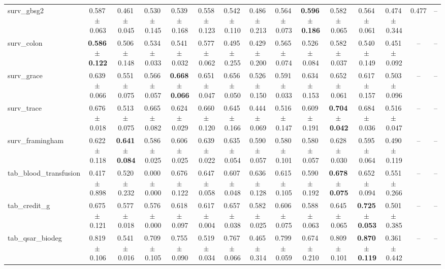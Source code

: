 \documentclass[8pt]{extarticle}
\begin{document}
\begin{longtable}{l*{14}{c}}
surv\_gbsg2 & 0.587\,$\pm$\,0.063 & 0.461\,$\pm$\,0.045 & 0.530\,$\pm$\,0.145 & 0.539\,$\pm$\,0.168 & 0.558\,$\pm$\,0.123 & 0.542\,$\pm$\,0.110 & 0.486\,$\pm$\,0.213 & 0.564\,$\pm$\,0.073 & \textbf{0.596\,$\pm$\,0.186} & 0.582\,$\pm$\,0.065 & 0.564\,$\pm$\,0.061 & 0.474\,$\pm$\,0.344 & 0.477 & -- \\
surv\_colon & \textbf{0.586\,$\pm$\,0.122} & 0.506\,$\pm$\,0.148 & 0.534\,$\pm$\,0.033 & 0.541\,$\pm$\,0.032 & 0.577\,$\pm$\,0.062 & 0.495\,$\pm$\,0.255 & 0.429\,$\pm$\,0.200 & 0.565\,$\pm$\,0.074 & 0.526\,$\pm$\,0.084 & 0.582\,$\pm$\,0.037 & 0.540\,$\pm$\,0.149 & 0.451\,$\pm$\,0.092 & -- & -- \\
surv\_grace & 0.639\,$\pm$\,0.066 & 0.551\,$\pm$\,0.075 & 0.566\,$\pm$\,0.057 & \textbf{0.668\,$\pm$\,0.066} & 0.651\,$\pm$\,0.047 & 0.656\,$\pm$\,0.050 & 0.526\,$\pm$\,0.150 & 0.591\,$\pm$\,0.033 & 0.634\,$\pm$\,0.153 & 0.652\,$\pm$\,0.061 & 0.617\,$\pm$\,0.157 & 0.503\,$\pm$\,0.096 & -- & -- \\
surv\_trace & 0.676\,$\pm$\,0.018 & 0.513\,$\pm$\,0.075 & 0.665\,$\pm$\,0.082 & 0.624\,$\pm$\,0.029 & 0.660\,$\pm$\,0.120 & 0.645\,$\pm$\,0.166 & 0.444\,$\pm$\,0.069 & 0.516\,$\pm$\,0.147 & 0.609\,$\pm$\,0.191 & \textbf{0.704\,$\pm$\,0.042} & 0.684\,$\pm$\,0.036 & 0.516\,$\pm$\,0.047 & -- & -- \\
surv\_framingham & 0.622\,$\pm$\,0.118 & \textbf{0.641\,$\pm$\,0.084} & 0.586\,$\pm$\,0.025 & 0.606\,$\pm$\,0.025 & 0.639\,$\pm$\,0.022 & 0.635\,$\pm$\,0.054 & 0.590\,$\pm$\,0.057 & 0.580\,$\pm$\,0.101 & 0.580\,$\pm$\,0.057 & 0.628\,$\pm$\,0.030 & 0.595\,$\pm$\,0.064 & 0.490\,$\pm$\,0.119 & -- & -- \\
tab\_blood\_transfusion & 0.417\,$\pm$\,0.898 & 0.520\,$\pm$\,0.232 & 0.000\,$\pm$\,0.000 & 0.676\,$\pm$\,0.122 & 0.647\,$\pm$\,0.058 & 0.607\,$\pm$\,0.048 & 0.636\,$\pm$\,0.128 & 0.615\,$\pm$\,0.105 & 0.590\,$\pm$\,0.192 & \textbf{0.678\,$\pm$\,0.075} & 0.652\,$\pm$\,0.094 & 0.551\,$\pm$\,0.266 & -- & -- \\
tab\_credit\_g & 0.675\,$\pm$\,0.121 & 0.577\,$\pm$\,0.018 & 0.576\,$\pm$\,0.000 & 0.618\,$\pm$\,0.097 & 0.617\,$\pm$\,0.004 & 0.657\,$\pm$\,0.038 & 0.582\,$\pm$\,0.025 & 0.606\,$\pm$\,0.075 & 0.588\,$\pm$\,0.063 & 0.645\,$\pm$\,0.065 & \textbf{0.725\,$\pm$\,0.053} & 0.501\,$\pm$\,0.385 & -- & -- \\
tab\_qsar\_biodeg & 0.819\,$\pm$\,0.106 & 0.541\,$\pm$\,0.016 & 0.709\,$\pm$\,0.105 & 0.755\,$\pm$\,0.090 & 0.519\,$\pm$\,0.034 & 0.767\,$\pm$\,0.066 & 0.465\,$\pm$\,0.314 & 0.799\,$\pm$\,0.059 & 0.674\,$\pm$\,0.210 & 0.809\,$\pm$\,0.101 & \textbf{0.870\,$\pm$\,0.119} & 0.361\,$\pm$\,0.442 & -- & -- \\

\end{longtable}
\end{document}
